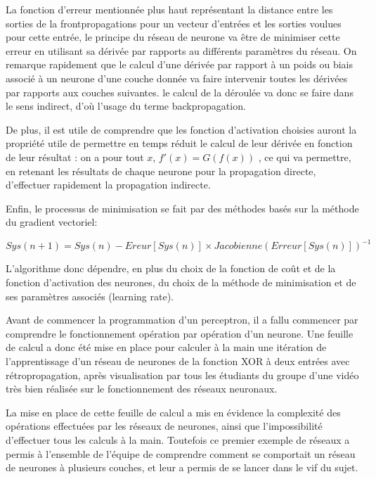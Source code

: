 \documentclass[
    10pt,
    a4paper,
    oneside,
    headinclude,footinclude,
    BCOR=5mm,
    captions=tableabove
]{scrartcl}
\begin{document}
La fonction d'erreur mentionnée plus haut représentant la distance entre les sorties de la frontpropagations pour un vecteur d'entrées et les sorties voulues pour cette entrée, le principe du réseau de neurone va être de minimiser cette erreur en utilisant sa dérivée par rapports au différents paramètres du réseau. On remarque rapidement que le calcul d'une dérivée par rapport à un poids ou biais associé à un neurone d'une couche donnée va faire intervenir toutes les dérivées par rapports aux couches suivantes. le calcul de la déroulée va donc se faire dans le sens indirect, d'où l'usage du terme backpropagation.

De plus, il est utile de comprendre que les fonction d'activation choisies auront la propriété utile de permettre en temps réduit le calcul de leur dérivée en fonction de leur résultat : on a pour tout $x$, $f'(x)=G(f(x))$ , ce qui va permettre, en retenant les résultats de chaque neurone pour la propagation directe, d'effectuer rapidement la propagation indirecte. 

Enfin, le processus de minimisation se fait par des méthodes basés sur la méthode du gradient vectoriel:

$$Sys(n+1) = Sys(n) - Ereur[Sys(n)] \times Jacobienne(Erreur[Sys(n)]) ^{-1} $$ 

L'algorithme donc dépendre, en plus du choix de la fonction de coût et de la fonction d'activation des neurones, du choix de la méthode de minimisation et de ses paramètres associés (learning rate).

Avant de commencer la programmation d'un perceptron, il a fallu commencer par comprendre le fonctionnement opération par opération d'un neurone. Une feuille de calcul a donc été mise en place pour calculer à la main une itération de l'apprentissage d'un réseau de neurones de la fonction XOR à deux entrées avec rétropropagation, après visualisation par tous les étudiants du groupe d'une vidéo très bien réalisée sur le fonctionnement des réseaux neuronaux.

La mise en place de cette feuille de calcul a mis en évidence la complexité des opérations effectuées par les réseaux de neurones, ainsi que l'impossibilité d'effectuer tous les calculs à la main. Toutefois ce premier exemple de réseaux a permis à l'ensemble de l'équipe de comprendre comment se comportait un réseau de neurones à plusieurs couches, et leur a permis de se lancer dans le vif du sujet. 
\end{document}
